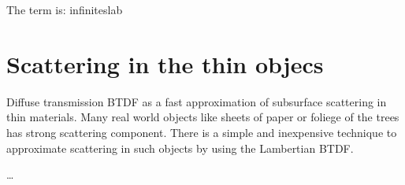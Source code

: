 The term is: \gls{infiniteslab}

\section{Scattering in the thin objecs}
Diffuse transmission BTDF as a fast approximation of subsurface scattering in
thin materials.
Many real world objects like sheets of paper or foliege of the trees has strong
scattering component. There is a simple and inexpensive technique to approximate
scattering in such objects by using the Lambertian BTDF.

\ldots
